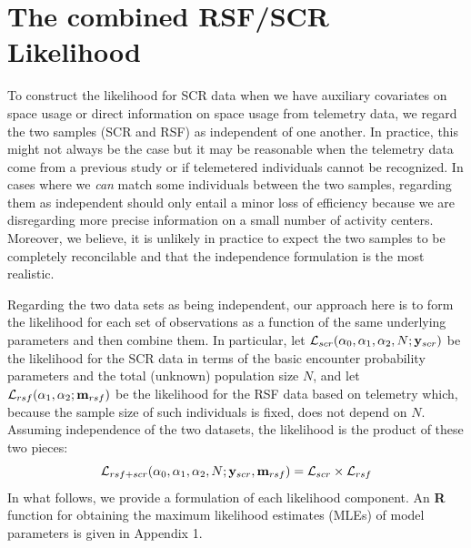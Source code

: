 \documentclass[12pt]{article}
\begin{document}
\section{The combined RSF/SCR Likelihood}
\label{sec.likelihood}

To construct the likelihood for SCR data when we have auxiliary
covariates on space usage or   %
direct information on space usage
from telemetry data, we regard the two samples (SCR and RSF) as
independent of one another. In practice, this might not always be the
case but it may be reasonable when the telemetry data come from a
previous study or
if telemetered individuals cannot be recognized.
In cases where we {\it
  can} match some individuals between the two samples, regarding them as
independent should only entail a minor
loss of efficiency
because we are disregarding more precise information on a small number
of activity centers. Moreover, we believe, it is unlikely in practice
to expect the two samples to be completely reconcilable and that the
independence formulation is the most
realistic.

Regarding the two data sets as being independent, our approach here
is to form the likelihood for each set of observations as a function
of the same underlying parameters and then combine them. In
particular, let ${\cal L}_{scr}(\alpha_{0}, \alpha_{1}, \alpha_{2}, N;
{\bf y}_{scr})$
be the likelihood for the SCR data in terms of the basic encounter
probability parameters and the total (unknown) population size $N$,
and let ${\cal L}_{rsf}(\alpha_{1},\alpha_{2}; {\bf m}_{rsf})$ be the
likelihood for the RSF data based on telemetry which, because the
sample size of such individuals is fixed, does not depend on $N$.
Assuming independence of the two datasets, the
likelihood is the product of these two pieces:
\[
{\cal L}_{rsf+scr}(\alpha_{0},\alpha_{1},\alpha_{2},N; {\bf y}_{scr},{\bf
  m}_{rsf})  = {\cal L}_{scr} \times {\cal L}_{rsf}
\]
In what follows, we provide a formulation of each likelihood
component. An  {\bf R} \citep{rdevelopmentcoreteam:2004} function for obtaining the maximum likelihood
estimates (MLEs) of
model parameters is given in Appendix 1.
\end{document}
